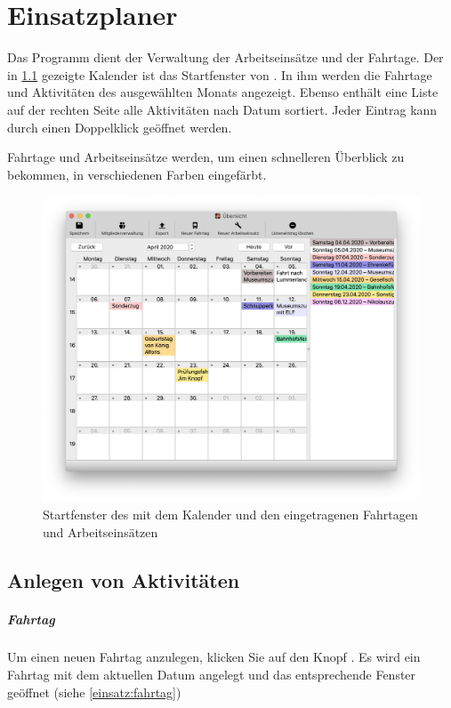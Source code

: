 \chapter{Einsatzplaner}\label{einsatz:kalender}
Das Programm \Einsatz dient der Verwaltung der Arbeitseinsätze und der Fahrtage.
Der in \cref{fig:einsatz:kalender} gezeigte Kalender ist das Startfenster von \Einsatz.
In ihm werden die Fahrtage und Aktivitäten des ausgewählten Monats angezeigt.
Ebenso enthält eine Liste auf der rechten Seite alle Aktivitäten nach Datum sortiert.
Jeder Eintrag kann durch einen Doppelklick geöffnet werden.


Fahrtage und Arbeitseinsätze werden,
um einen schnelleren Überblick zu bekommen,
in verschiedenen Farben eingefärbt.

\begin{figure}[h]
  \includegraphics[width=\textwidth]{img/kalender}
  \caption{
  Startfenster des \Einsatz mit dem Kalender und den eingetragenen Fahrtagen und Arbeitseinsätzen}
  \label{fig:einsatz:kalender}
\end{figure}



\section{Anlegen von Aktivitäten}\label{einsatz:kalender:anlegen}
\paragraph{Fahrtag}
Um einen neuen Fahrtag anzulegen, klicken Sie auf den Knopf .
Es wird ein Fahrtag mit dem aktuellen Datum angelegt und das entsprechende Fenster geöffnet (siehe \cref{einsatz:fahrtag})

